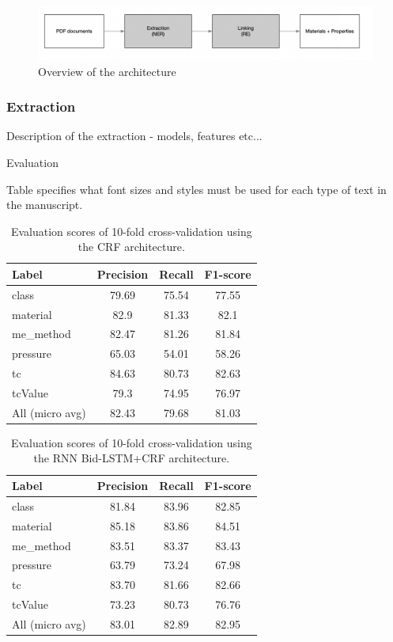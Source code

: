 \documentclass{article}
\begin{document}
\begin{figure}[ht]
\includegraphics[width=\textwidth]{overview-schema}
\caption{Overview of the architecture}
\end{figure}

\subsubsection{Extraction}

Description of the extraction 
 - models, features etc...
 
Evaluation

Table specifies what font sizes and styles must be used for each type of text in the manuscript.

\begin{table}[ht]
\centering
\begin{tabular}{lccc}
\hline \textbf{Label} & \textbf{Precision} & \textbf{Recall} & \textbf{F1-score} \\ \hline
class           & 79.69 & 75.54 & 77.55 \\
material        & 82.9  & 81.33 & 82.1  \\
me\_method       & 82.47 & 81.26 & 81.84 \\
pressure        & 65.03 & 54.01 & 58.26 \\
tc              & 84.63 & 80.73 & 82.63 \\
tcValue         & 79.3  & 74.95 & 76.97 \\
\hline
All (micro avg) & 82.43 & 79.68 & 81.03 \\
\hline
\end{tabular}
\caption{Evaluation scores of 10-fold cross-validation using the CRF architecture. }
\end{table}


\begin{table}[ht]
\centering
\begin{tabular}{lccc}
\hline \textbf{Label} & \textbf{Precision} & \textbf{Recall} & \textbf{F1-score} \\ \hline
class           & 81.84 & 83.96 & 82.85 \\
material        & 85.18 & 83.86 & 84.51 \\
me\_method      & 83.51 & 83.37 & 83.43 \\
pressure        & 63.79 & 73.24 & 67.98 \\
tc              & 83.70 & 81.66 & 82.66 \\
tcValue         & 73.23 & 80.73 & 76.76 \\
\hline
All (micro avg) & 83.01 & 82.89 & 82.95 \\
\hline
\end{tabular}
\caption{ Evaluation scores of 10-fold cross-validation using the RNN Bid-LSTM+CRF architecture. }
\end{table}
\end{document}
